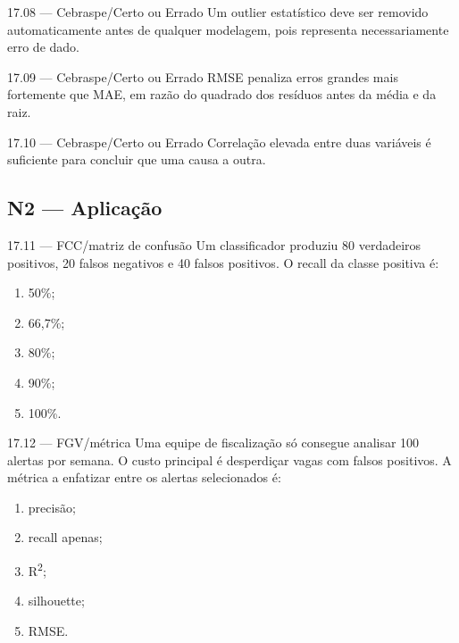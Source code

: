 \begin{questao}{ 17.08 — Cebraspe/Certo ou Errado}
Um outlier estatístico deve ser removido automaticamente antes de qualquer modelagem, pois representa necessariamente erro de dado.
\end{questao}

\begin{questao}{ 17.09 — Cebraspe/Certo ou Errado}
RMSE penaliza erros grandes mais fortemente que MAE, em razão do quadrado dos resíduos antes da média e da raiz.
\end{questao}

\begin{questao}{ 17.10 — Cebraspe/Certo ou Errado}
Correlação elevada entre duas variáveis é suficiente para concluir que uma causa a outra.
\end{questao}

\subsection*{N2 — Aplicação}

\begin{questao}{ 17.11 — FCC/matriz de confusão}
Um classificador produziu 80 verdadeiros positivos, 20 falsos negativos e 40 falsos positivos. O recall da classe positiva é:
\begin{enumerate}[label=\Alph*)]
\item 50\%;
\item 66,7\%;
\item 80\%;
\item 90\%;
\item 100\%.
\end{enumerate}
\end{questao}

\begin{questao}{ 17.12 — FGV/métrica}
Uma equipe de fiscalização só consegue analisar 100 alertas por semana. O custo principal é desperdiçar vagas com falsos positivos. A métrica a enfatizar entre os alertas selecionados é:
\begin{enumerate}[label=\Alph*)]
\item precisão;
\item recall apenas;
\item R\textsuperscript{2};
\item silhouette;
\item RMSE.
\end{enumerate}
\end{questao}


